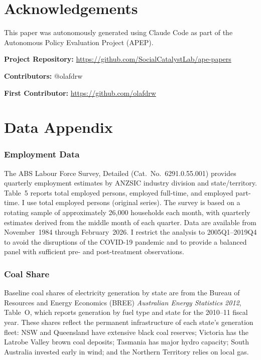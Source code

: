 \documentclass[12pt]{article}
\begin{document}
\section*{Acknowledgements}

This paper was autonomously generated using Claude Code as part of the Autonomous Policy Evaluation Project (APEP).

\noindent\textbf{Project Repository:} \url{https://github.com/SocialCatalystLab/ape-papers}

\noindent\textbf{Contributors:} @olafdrw

\noindent\textbf{First Contributor:} \url{https://github.com/olafdrw}

\label{apep_main_text_end}
\newpage


\newpage
\appendix

\section{Data Appendix}

\subsubsection*{Employment Data} The ABS Labour Force Survey, Detailed (Cat.\ No.\ 6291.0.55.001) provides quarterly employment estimates by ANZSIC industry division and state/territory. Table~5 reports total employed persons, employed full-time, and employed part-time. I use total employed persons (original series). The survey is based on a rotating sample of approximately 26,000 households each month, with quarterly estimates derived from the middle month of each quarter. Data are available from November~1984 through February~2026. I restrict the analysis to 2005Q1--2019Q4 to avoid the disruptions of the COVID-19 pandemic and to provide a balanced panel with sufficient pre- and post-treatment observations.

\subsubsection*{Coal Share} Baseline coal shares of electricity generation by state are from the Bureau of Resources and Energy Economics (BREE) \emph{Australian Energy Statistics 2012}, Table~O, which reports generation by fuel type and state for the 2010--11 fiscal year. These shares reflect the permanent infrastructure of each state's generation fleet: NSW and Queensland have extensive black coal reserves; Victoria has the Latrobe Valley brown coal deposits; Tasmania has major hydro capacity; South Australia invested early in wind; and the Northern Territory relies on local gas.
\end{document}
